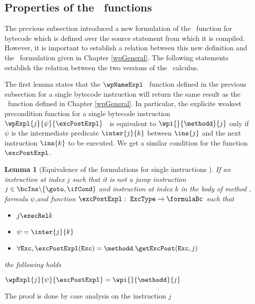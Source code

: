 \newtheorem{wpIns}{Lemma}[subsection]
\newtheorem{wpBlock}[wpIns]{Lemma}
\newtheorem{relWpExpr}[wpIns]{Lemma}
\newtheorem{relWpStmt}[wpIns]{Lemma}

\subsection{Properties of the \wpName \ functions}\label{pog:wpBcProp}
    The previous subsection introduced a new formulation of the 
    \wpName \ function for bytecode which is defined over
    the source statement from which it is compiled. 
    However, it is important to establish a relation between this new definition
    and  the \wpName \ formulation given in  Chapter \ref{wpGeneral}.
    The following statements establish the relation between 
    the two versions of the \wpName \  calculus.


The first lemma states that the $\wpNameExpl$ \ function defined in the previous subsection 
 for a single bytecode instruction
 will return the same result as the \fwpi \ function defined in Chapter \ref{wpGeneral}.  In particular, the explicite
 weakest precondition function for a single bytecode instruction 
  $\wpExpl{ j}{ \psi  }{ \excPostExpl} $ \ is equivalent to $\wpi{}{\methodd}{j}$ only if 
$\psi$  is the intermediate predicate $\inter{j}{k}$ between $\ins{j}$ and the next instruction
 $\ins{k}$ to be executed. We get a similar condition for the function $\excPostExpl$.

\begin{wpIns}[Equivalence of the formulations for single instructions ]\label{wpIns}
If an instruction at index $j$ such that it is not a jump instruction
 $j  \in \bcIns \backslash \{ \goto , \ifCond\}$ and  instruction at index $k$ in the body of method \methodd,  formula
 $\psi$,and  function $\excPostExpl : \mbox{ \rm \texttt{ExcType}}  \rightarrow \formulaBc $ such that
\begin{itemize}
   \item  $j \execRel k$
   \item  $\psi = \inter{j}{k}$  
   \item  $\forall \mbox{\rm\texttt{Exc}} ,  \excPostExpl( \mbox{\rm\texttt{Exc}} ) = \methodd.\getExcPost(\mbox{\rm\texttt{Exc}}, j ) $ 
\end{itemize}

the following holds 

   $\wpExpl{ j}{ \psi  }{ \excPostExpl} = \wpi{}{\methodd}{j} $
\end{wpIns}
The proof is done by case analysis on the instruction $j$\\


